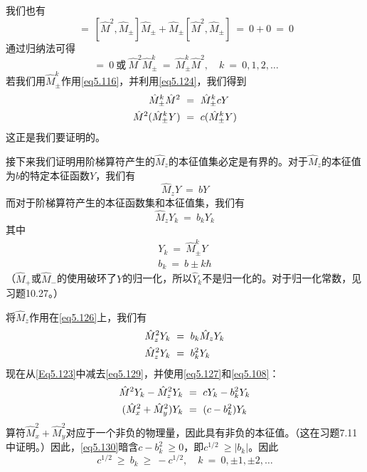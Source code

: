 \documentclass[12pt,a4paper,openany]{ctexbook}
\newcommand{\abs}[1]{\left| #1 \right|}
\begin{document}
\begin{flushleft}
我们也有
\begin{equation*}
    [\hat{M}^2,\hat{M}_{\pm}^2]\ =\ [\hat{M}^2,\hat{M}_{\pm}]\hat{M}_{\pm}+\hat{M}_{\pm}[\hat{M}^2,\hat{M}_{\pm}]\ =\ 0+0\ =\ 0
\end{equation*}
通过归纳法可得
\begin{equation}
    [\hat{M}^2,\hat{M}_{\pm}^k]\ =\ 0\ \text{或}\ \hat{M}^2\hat{M}_{\pm}^k\ =\ \hat{M}_{\pm}^k\hat{M}^2,\quad k\ =\ 0,1,2,\dots \label{eq5.124}
\end{equation}
若我们用$\hat{M}_{\pm}^k$作用\eqref{eq5.116}，并利用\eqref{eq5.124}，我们得到
\begin{align}
    \hat{M}_{\pm}^k\hat{M}^2\ &=\ \hat{M}_{\pm}^kcY \notag \\
    \hat{M}^2(\hat{M}_{\pm}^kY)\ &=\ c(\hat{M}_{\pm}^kY) \label{eq5.125}
\end{align}
这正是我们要证明的。

接下来我们证明用阶梯算符产生的$\hat{M}_z$的本征值集必定是有界的。对于$\hat{M}_z$的本征值为$b$的特定本征函数$Y$，我们有
\begin{equation*}
    \hat{M}_zY\ =\ bY
\end{equation*}
而对于阶梯算符产生的本征函数集和本征值集，我们有
\begin{equation}
    \hat{M}_zY_k\ =\ b_kY_k \label{eq5.126}
\end{equation}
其中
\begin{gather}
    Y_k\ =\ \hat{M}_{\pm}^kY \label{eq5.127} \\
    b_k\ =\ b\pm k\hbar \label{eq5.128}
\end{gather}
（$\hat{M}_+$或$\hat{M}_-$的使用破环了$Y$的归一化，所以$\hat{Y}_k$不是归一化的。对于归一化常数，见习题10.27。）

将$\hat{M}_z$作用在\eqref{eq5.126}上，我们有
\begin{align}
    \hat{M}_z^2Y_k\ &=\ b_k\hat{M}_zY_k \notag \\
    \hat{M}_z^2Y_k\ &=\ b_k^2Y_k \label{eq5.129}
\end{align}
现在从\eqref{Eq5.123}中减去\eqref{eq5.129}，并使用\eqref{eq5.127}和\eqref{eq5.108}：
\begin{align}
    \hat{M}^2Y_k-\hat{M}_z^2Y_k\ &=\ cY_k-b_k^2Y_k \notag \\
    (\hat{M}_x^2+\hat{M}_y^2)Y_k\ &=\ (c-b_k^2)Y_k \label{eq5.130}
\end{align}
算符$\hat{M}_x^2+\hat{M}_y^2$对应于一个非负的物理量，因此具有非负的本征值。（这在习题7.11中证明。）因此，\eqref{eq5.130}暗含$c-b_k^2\ \geq 0$，即$c^{1/2}\ \geq \abs{b_k}$。因此
\begin{equation}
    c^{1/2}\ \geq\ b_k\ \geq\ -c^{1/2},\quad k\ =\ 0,\pm1,\pm2,\dots \label{eq5.131}
\end{equation}


\end{flushleft}
\end{document}
